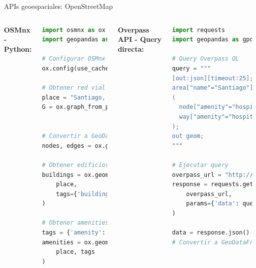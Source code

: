 \documentclass[10pt,aspectratio=169]{beamer}
\begin{document}
\begin{frame}[fragile]{APIs geoespaciales: OpenStreetMap}
    \begin{columns}[T]
        \textbf{OSMnx - Python:}
        \begin{lstlisting}[language=Python]
import osmnx as ox
import geopandas as gpd

# Configurar OSMnx
ox.config(use_cache=True, log_console=True)

# Obtener red vial de Santiago
place = "Santiago, Chile"
G = ox.graph_from_place(place, 
                        network_type='drive')

# Convertir a GeoDataFrame
nodes, edges = ox.graph_to_gdfs(G)

# Obtener edificios
buildings = ox.geometries_from_place(
    place, 
    tags={'building': True}
)

# Obtener amenities específicos
tags = {'amenity': ['hospital', 'school']}
amenities = ox.geometries_from_place(
    place, tags
)
        \end{lstlisting}
        
        \textbf{Overpass API - Query directa:}
        \begin{lstlisting}[language=Python]
import requests
import geopandas as gpd

# Query Overpass QL
query = """
[out:json][timeout:25];
area["name"="Santiago"]->.searchArea;
(
  node["amenity"="hospital"](area.searchArea);
  way["amenity"="hospital"](area.searchArea);
);
out geom;
"""

# Ejecutar query
overpass_url = "http://overpass-api.de/api/interpreter"
response = requests.get(
    overpass_url, 
    params={'data': query}
)

data = response.json()
# Convertir a GeoDataFrame...
        \end{lstlisting}
    \end{columns}
\end{frame}
\end{document}

